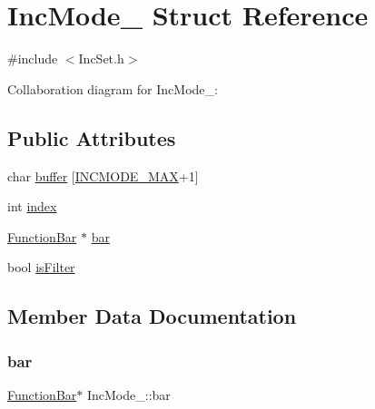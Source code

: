 \hypertarget{structIncMode__}{}\section{Inc\+Mode\+\_\+ Struct Reference}
\label{structIncMode__}


{\ttfamily \#include $<$Inc\+Set.\+h$>$}



Collaboration diagram for Inc\+Mode\+\_\+\+:
\subsection*{Public Attributes}
\begin{DoxyCompactItemize}
\item 
char \hyperlink{structIncMode___a3830019f923ee5582b92eb1f894ddf1e}{buffer} \mbox{[}\hyperlink{IncSet_8h_a7f8869def47bfc5a3199348e5d3e450a}{I\+N\+C\+M\+O\+D\+E\+\_\+\+M\+AX}+1\mbox{]}
\item 
int \hyperlink{structIncMode___a9ed1c40b60d9085af3e309ea7f1af280}{index}
\item 
\hyperlink{FunctionBar_8h_acbf21c40af2139c165bafd8061c2ceda}{Function\+Bar} $\ast$ \hyperlink{structIncMode___a9ca366a9c070db9c5dc5def513b97cac}{bar}
\item 
bool \hyperlink{structIncMode___a31d1b4f522fb3c2ad690968b8dd44ab1}{is\+Filter}
\end{DoxyCompactItemize}


\subsection{Member Data Documentation}
\mbox{\label{structIncMode___a9ca366a9c070db9c5dc5def513b97cac}} 
\subsubsection{\texorpdfstring{bar}{bar}}
{\footnotesize\ttfamily \hyperlink{FunctionBar_8h_acbf21c40af2139c165bafd8061c2ceda}{Function\+Bar}$\ast$ Inc\+Mode\+\_\+\+::bar}

\mbox{\label{structIncMode___a3830019f923ee5582b92eb1f894ddf1e}} 
